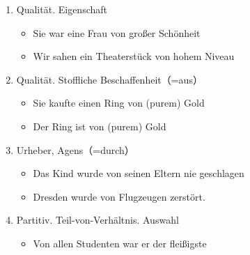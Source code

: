 \documentclass[UTF8]{report}
\begin{document}
\begin{enumerate}
    \begin{enumerate}
        \item Qualität. Eigenschaft
        \begin{itemize}
            \item Sie war eine Frau von großer Schönheit
            \item Wir sahen ein Theaterstück von hohem Niveau
        \end{itemize}
        \item Qualität. Stoffliche Beschaffenheit（=aus）
        \begin{itemize}
            \item Sie kaufte einen Ring von (purem) Gold
            \item Der Ring ist von (purem) Gold
        \end{itemize}
        \item Urheber, Agens（=durch）
        \begin{itemize}
            \item Das Kind wurde von seinen Eltern nie geschlagen
            \item Dresden wurde von Flugzeugen zerstört.
        \end{itemize}
        \item Partitiv. Teil-von-Verhältnis. Auswahl
        \begin{itemize}
            \item Von allen Studenten war er der fleißigste
        \end{itemize}
    \end{enumerate}
\end{enumerate}
\end{document}
